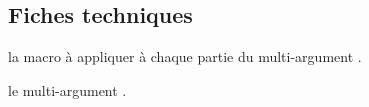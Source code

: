 \documentclass[12pt,a4paper]{article}
\begin{document}
\begin{latexex-alone}
\newcommand\decoafterfirst[1]{%
    \ifnum\value{tns@multi@apply@each@position}=1
        #1:%
    \else%
        << #1 >> \quad%
    \fi%
}

\newcommand\multiapplyafterone[1]{%
    \tns@multi@apply@each{\decoafterfirst}{#1}
}
\end{latexex-alone}




\subsection{Fiches techniques}


 la macro à appliquer à chaque partie du \og multi-argument \fg.

 le \og multi-argument \fg.
\end{document}
